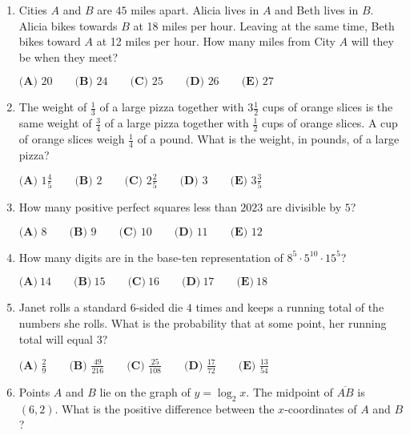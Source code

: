 \documentclass{article}
\begin{document}
\begin{enumerate}[label=\arabic*., itemsep=0.5em]
\item Cities \(A\) and \(B\) are \(45\) miles apart. Alicia lives in \(A\) and Beth lives in \(B\). Alicia bikes towards \(B\) at 18 miles per hour. Leaving at the same time, Beth bikes toward \(A\) at 12 miles per hour. How many miles from City \(A\) will they be when they meet?

\(\textbf{(A) }20\qquad\textbf{(B) }24\qquad\textbf{(C) }25\qquad\textbf{(D) }26\qquad\textbf{(E) }27\)\par \vspace{0.5em}\item The weight of \(\frac{1}{3}\) of a large pizza together with \(3 \frac{1}{2}\) cups of orange slices is the same weight of \(\frac{3}{4}\) of a large pizza together with \(\frac{1}{2}\) cups of orange slices. A cup of orange slices weigh \(\frac{1}{4}\) of a pound. What is the weight, in pounds, of a large pizza?

\(\textbf{(A) }1\frac{4}{5}\qquad\textbf{(B) }2\qquad\textbf{(C) }2\frac{2}{5}\qquad\textbf{(D) }3\qquad\textbf{(E) }3\frac{3}{5}\)\par \vspace{0.5em}\item How many positive perfect squares less than \(2023\) are divisible by \(5\)?

\(\textbf{(A) }8\qquad\textbf{(B) }9\qquad\textbf{(C) }10\qquad\textbf{(D) }11\qquad\textbf{(E) }12\)\par \vspace{0.5em}\item How many digits are in the base-ten representation of \(8^5 \cdot 5^{10} \cdot 15^5\)?

\(\textbf{(A)}~14\qquad\textbf{(B)}~15\qquad\textbf{(C)}~16\qquad\textbf{(D)}~17\qquad\textbf{(E)}~18\qquad\)\par \vspace{0.5em}\item Janet rolls a standard \(6\)-sided die \(4\) times and keeps a running total of the numbers she rolls. What is the probability that at some point, her running total will equal \(3?\)

\(\textbf{(A) }\frac{2}{9}\qquad\textbf{(B) }\frac{49}{216}\qquad\textbf{(C) }\frac{25}{108}\qquad\textbf{(D) }\frac{17}{72}\qquad\textbf{(E) }\frac{13}{54}\)\par \vspace{0.5em}\item Points \(A\) and \(B\) lie on the graph of \(y=\log_{2}x\). The midpoint of \(\overline{AB}\) is \((6, 2)\). What is the positive difference between the \(x\)-coordinates of \(A\) and \(B\)?


\end{enumerate}
\end{document}
